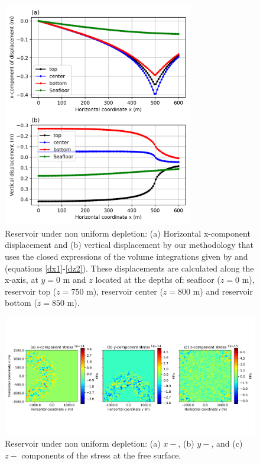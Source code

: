 \documentclass[journal abbreviation, manuscript]{copernicus}
\begin{document}
\begin{figure}[ht]
\includegraphics[width=8.3cm]{Fig/Figure_Displacement_z_levels_non_uniform_depletion.png}
\caption{Reservoir under non uniform depletion: (a) Horizontal x-component displacement and (b) vertical displacement by our methodology that uses the closed expressions of the volume integrations given by \cite{Nagyetal2000} and \cite{Nagyetal2002} (equations \ref{dx1}-\ref{dz2}).
These displacements are calculated along the x-axis, at $y = 0$ m and $z$ located at the depths of:  seafloor ($z = 0$ m), reservoir top ($z = 750$ m), reservoir center ($z = 800$ m) and reservoir bottom ($z = 850$ m).}
\label{fig:displacement_z_levels_non_uniform_depletion}
\end{figure}


\begin{figure}[ht]
\includegraphics[width=12cm]{Fig/Figure_Null_stress_non_uniform_depletion.png}
\caption{Reservoir under non uniform depletion: (a) $x-$, (b) $y-$, and (c) $z-$ components of the stress at the free surface.}
\label{fig:Null_stress_non_uniform_depletion}
\end{figure}
\end{document}
